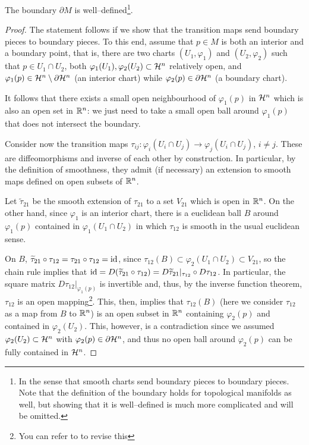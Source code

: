 \begin{proposition}\label{prop:bdwelldef}
	The boundary $\partial M$ is well--defined\footnote{In the sense that smooth charts send boundary pieces to boundary pieces. Note that the definition of the boundary holds for topological manifolds as well, but showing that it is well--defined is much more complicated and will be omitted.}.
\end{proposition}
\begin{proof}
	The statement follows if we show that the transition maps send boundary pieces to boundary pieces.
	To this end, assume that $p\in M$ is both an interior and a boundary point, that is, there are two charts $(U_1, \varphi_1)$ and $(U_2,\varphi_2)$ such that $p \in U_1\cap U_2$, both $\varphi_1(U_1), \varphi_2(U_2) \subset\mathcal{H}^n$ relatively open, and $\varphi_1(p) \in \mathcal{H}^n\setminus\partial\mathcal{H}^n$ (an interior chart) while $\varphi_2(p) \in \partial\mathcal{H}^n$ (a boundary chart).

	It follows that there exists a small open neighbourhood of $\varphi_1(p)$ in $\mathcal{H}^n$ which is also an open set in $\mathbb{R}^n$: we just need to take a small open ball around $\varphi_1(p)$ that does not intersect the boundary.

	Consider now the transition maps $\tau_{ij} : \varphi_i(U_i\cap U_j) \to \varphi_j(U_i\cap U_j)$, $i\neq j$.
	These are diffeomorphisms and inverse of each other by construction.
	In particular, by the definition of smoothness, they admit (if necessary) an extension to smooth maps defined on open subsets of $\mathbb{R}^n$.

	Let $\widetilde\tau_{21}$ be the smooth extension of $\tau_{21}$ to a set $V_{21}$ which is open in $\mathbb{R}^n$.
	On the other hand, since $\varphi_1$ is an interior chart, there is a euclidean ball $B$ around $\varphi_1(p)$ contained in $\varphi_1(U_1\cap U_2)$ in which $\tau_{12}$ is smooth in the usual euclidean sense.

	On $B$, $\widetilde\tau_{21} \circ \tau_{12} = \tau_{21} \circ \tau_{12} = \operatorname{id}$, since $\tau_{12}(B)\subset\varphi_2(U_1\cap U_2)\subset V_{21}$, so the chain rule implies that $\operatorname{id} = D (\widetilde\tau_{21} \circ \tau_{12}) = D\widetilde\tau_{21}|_{\tau_{12}} \circ D\tau_{12}$.
	In particular, the square matrix $D\tau_{12}|_{\varphi_1(p)}$ is invertible and, thus, by the inverse function theorem, $\tau_{12}$ is an open mapping\footnote{You can refer to \cite[Corollary C.36]{book:lee} to revise this}.
	This, then, implies that $\tau_{12}(B)$ (here we consider $\tau_{12}$ as a map from $B$ to $\mathbb{R}^n$) is an open subset in $\mathbb{R}^n$ containing $\varphi_2(p)$ and contained in $\varphi_2(U_2)$.
	This, however, is a contradiction since we assumed $\varphi_2(U_2)\subset\mathcal{H}^n$ with $\varphi_2(p) \in \partial\mathcal{H}^n$, and thus no open ball around $\varphi_2(p)$ can be fully contained in $\mathcal{H}^n$.
\end{proof}

